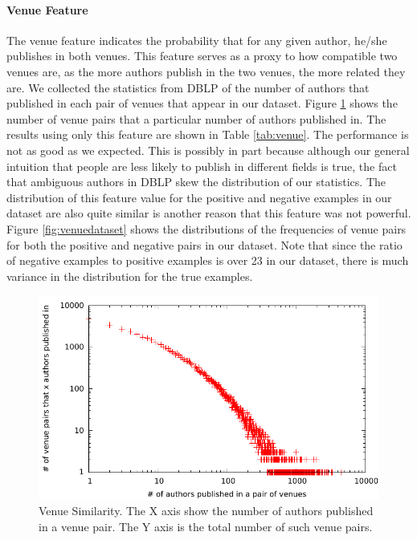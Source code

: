 \documentclass[twocolumn,letterpaper]{article}
\begin{document}

\paragraph{Venue Feature} %
\label{par:venue}
The venue feature indicates the probability that for any given author, he/she publishes in both venues.  This feature serves as a proxy to how compatible two venues are, as the more authors publish in the two venues, the more related they are.  We collected the statistics from DBLP of the number of authors that published in each pair of venues that appear in our dataset.  Figure \ref{fig:venue} shows the number of venue pairs that a particular number of authors published in.  The results using only this feature are shown in Table \ref{tab:venue}.  The performance is not as good as we expected.  This is possibly in part because although our general intuition that people are less likely to publish in different fields is true, the fact that ambiguous authors in DBLP skew the distribution of our statistics.  The distribution of this feature value for the positive and negative examples in our dataset are also quite similar is another reason that this feature was not powerful.  Figure \ref{fig:venuedataset} shows the distributions of the frequencies of venue pairs for both the positive and negative pairs in our dataset.  Note that since the ratio of negative examples to positive examples is over 23 in our dataset, there is much variance in the distribution for the true examples.
\begin{figure}
  \centering
  \includegraphics[width=\columnwidth]{venuepair}
  \caption{Venue Similarity.  The X axis show the number of authors published in a venue pair.  The Y axis is the total number of such venue pairs.}
  \label{fig:venue}
\end{figure}
\end{document}
